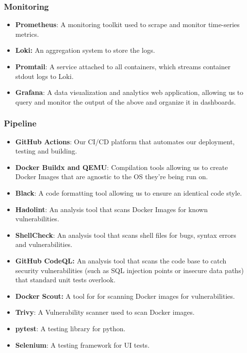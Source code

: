 \subsubsection{Monitoring}
\begin{itemize}
    \item \textbf{Prometheus}: A monitoring toolkit used to scrape and monitor time-series metrics. 
    \item \textbf{Loki:} An aggregation system to store the logs.
    
    \item \textbf{Promtail}: A service attached to all containers, which streams container stdout logs to Loki.
    
    \item \textbf{Grafana}: A data visualization and analytics web application, allowing us to query and monitor the output of the above and organize it in dashboards.
\end{itemize}

\subsubsection{Pipeline} \label{pipeline}
\begin{itemize}
    \item \textbf{GitHub Actions}: Our CI/CD platform that automates our deployment, testing and building.
    \item \textbf{Docker Buildx and QEMU}: Compilation tools allowing us to create Docker Images that are agnostic to the OS they're being run on.
    \item \textbf{Black}: A code formatting tool allowing us to ensure an identical code style.
    \item \textbf{Hadolint}: An analysis tool that scans Docker Images for known vulnerabilities.
    \item \textbf{ShellCheck}: An analysis tool that scans shell files for bugs, syntax errors and vulnerabilities.
    \item \textbf{GitHub CodeQL:} An analysis tool that scans the code base to catch security vulnerabilities (such as SQL injection points or insecure data paths) that standard unit tests overlook.
    \item \textbf{Docker Scout:} A tool for for scanning Docker images for vulnerabilities.  
    \item \textbf{Trivy}: A Vulnerability scanner used to scan Docker images.
    \item \textbf{pytest}: A testing library for python.
    \item \textbf{Selenium}: A testing framework for UI tests.
\end{itemize}


